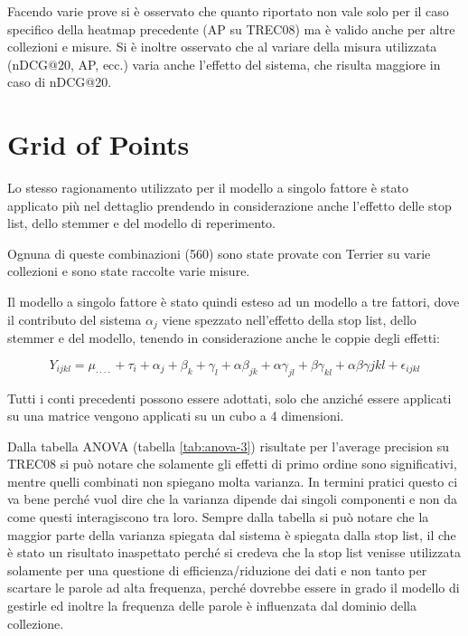 Facendo varie prove si è osservato che quanto riportato non vale solo per il caso specifico della heatmap precedente (AP su TREC08) ma è valido anche per altre collezioni e misure.
Si è inoltre osservato che al variare della misura utilizzata (nDCG@20, AP, ecc.) varia anche l'effetto del sistema, che risulta maggiore in caso di nDCG@20.

\section{Grid of Points}

Lo stesso ragionamento utilizzato per il modello a singolo fattore è stato applicato più nel dettaglio prendendo in considerazione anche l'effetto delle stop list, dello stemmer e del modello di reperimento.

Ognuna di queste combinazioni (560) sono state provate con Terrier su varie collezioni e sono state raccolte varie misure.

Il modello a singolo fattore è stato quindi esteso ad un modello a tre fattori, dove il contributo del sistema $\alpha_j$ viene spezzato nell'effetto della stop list, dello stemmer e del modello, tenendo in considerazione anche le coppie degli effetti:

$$
Y_{ijkl} = \mu_{\cdot\cdot\cdot\cdot} + \tau_i + \alpha_j + \beta_k + \gamma_l + \alpha\beta_{jk} + \alpha\gamma_{jl} + \beta\gamma_{kl}+\alpha\beta\gamma{jkl} + \epsilon_{ijkl}
$$

Tutti i conti precedenti possono essere adottati, solo che anziché essere applicati su una matrice vengono applicati su un cubo a 4 dimensioni.

Dalla tabella ANOVA (tabella \ref{tab:anova-3}) risultate per l'average precision su TREC08 si può notare che solamente gli effetti di primo ordine sono significativi, mentre quelli combinati non spiegano molta varianza.
In termini pratici questo ci va bene perché vuol dire che la varianza dipende dai singoli componenti e non da come questi interagiscono tra loro.
Sempre dalla tabella si può notare che la maggior parte della varianza spiegata dal sistema è spiegata dalla stop list, il che è stato un risultato inaspettato perché si credeva che la stop list venisse utilizzata solamente per una questione di efficienza/riduzione dei dati e non tanto per scartare le parole ad alta frequenza, perché dovrebbe essere in grado il modello di gestirle ed inoltre la frequenza delle parole è influenzata dal dominio della collezione.

